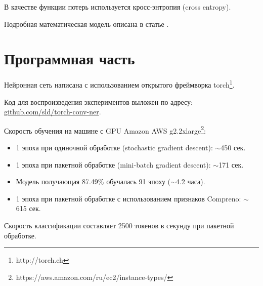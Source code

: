   В качестве функции потерь используется кросс-энтропия (cross entropy).

  Подробная математическая модель описана в статье \citep{collobert2011natural}.

\section{Программная часть}

Нейронная сеть написана с использованием открытого фреймворка torch\footnote{http://torch.ch}.

Код для воспроизведения экспериментов выложен по адресу:
\href{https://github.com/sld/torch-conv-ner}{github.com/sld/torch-conv-ner}.

Скорость обучения на машине с GPU Amazon AWS g2.2xlarge\footnote{https://aws.amazon.com/ru/ec2/instance-types/}:
\begin{itemize}
\item 1 эпоха при одиночной обработке (stochastic gradient descent): $\sim$450 сек.
\item 1 эпоха при пакетной обработке (mini-batch gradient descent): $\sim$171 сек.
\item Модель получающая 87.49\% обучалась 91 эпоху ($\sim$4.2 часа).
\item 1 эпоха при пакетной обработке с использованием признаков Compreno: $\sim$615 сек.
\end{itemize}

Скорость классификации составляет 2500 токенов в секунду при пакетной обработке.

